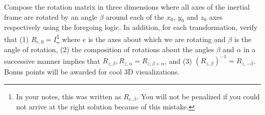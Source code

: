 \begin{homework}
	Compose the rotation matrix in three dimensions where all axes of the inertial frame are rotated by an angle $\beta$ around each of the $x_0$, $y_0$ and $z_0$ axes respectively using the foregoing logic. In addition, for each transformation, verify that (1) $R_{e, 0} = I$\footnote{In your notes, this was written as $R_{e, \beta}$. You will not be penalized if you could not arrive at the right solution because of this mistake.} where $e$ is the axes about which we are rotating and $\beta$ is the angle of rotation, (2) the composition of rotations about the angles $\beta$ and $\alpha$ in a successive manner implies that $R_{z, \beta}, R_{z, \alpha} = R_{z, \beta + \alpha}$, and (3) ${(R_{z, \beta})}^{-1} = R_{z, -\beta}$. Bonus points will be awarded for cool 3D visualizations.
\end{homework} 

